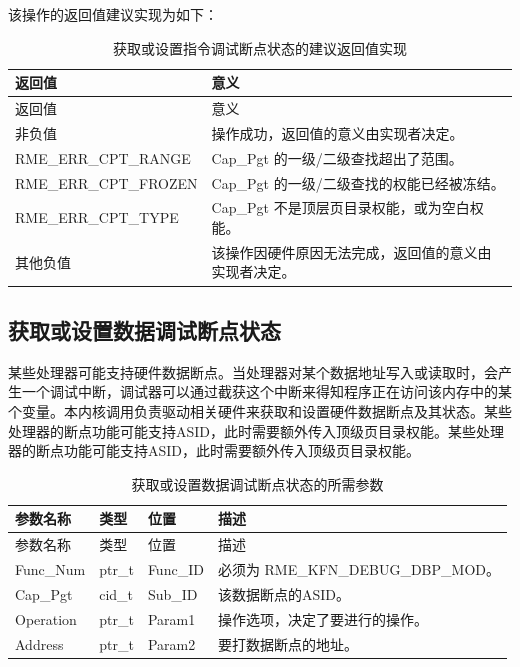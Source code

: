 该操作的返回值建议实现为如下：

\begin{xltabular}{\textwidth}{@{}>{\hsize\raggedright\arraybackslash}X>{\hsize\raggedright\arraybackslash}X@{}}
\caption{获取或设置指令调试断点状态的建议返回值实现}\label{tab:8-120-get-or-set-instruction-breakpoint-state-suggested-return-values}\\
\toprule
返回值 & 意义\tabularnewline
\endfirsthead
\toprule
返回值 & 意义\tabularnewline
\midrule
\endhead
\bottomrule
\endlastfoot
    非负值 & 操作成功，返回值的意义由实现者决定。\tabularnewline
    RME\_ERR\_CPT\_RANGE & Cap\_Pgt 的一级/二级查找超出了范围。\tabularnewline
    RME\_ERR\_CPT\_FROZEN & Cap\_Pgt 的一级/二级查找的权能已经被冻结。\tabularnewline
    RME\_ERR\_CPT\_TYPE & Cap\_Pgt 不是顶层页目录权能，或为空白权能。\tabularnewline
    其他负值 & 该操作因硬件原因无法完成，返回值的意义由实现者决定。\tabularnewline
\end{xltabular}

\subsection{获取或设置数据调试断点状态}\label{subsec:8-get-or-set-data-breakpoint-state}

某些处理器可能支持硬件数据断点。当处理器对某个数据地址写入或读取时，会产生一个调试中断，调试器可以通过截获这个中断来得知程序正在访问该内存中的某个变量。本内核调用负责驱动相关硬件来获取和设置硬件数据断点及其状态。某些处理器的断点功能可能支持ASID，此时需要额外传入顶级页目录权能。某些处理器的断点功能可能支持ASID，此时需要额外传入顶级页目录权能。

\begin{xltabular}{\textwidth}{@{}>{\hsize\raggedright\arraybackslash}X>{\hsize\raggedright\arraybackslash}X>{\hsize\raggedright\arraybackslash}X>{\hsize\raggedright\arraybackslash}X@{}}
\caption{获取或设置数据调试断点状态的所需参数}\label{tab:8-121-get-or-set-data-breakpoint-state-parameters}\\
\toprule
参数名称 & 类型 & 位置 & 描述\tabularnewline
\endfirsthead
\toprule
参数名称 & 类型 & 位置 & 描述\tabularnewline
\midrule
\endhead
\bottomrule
\endlastfoot
Func\_Num & ptr\_t & Func\_ID & 必须为 RME\_KFN\_DEBUG\_DBP\_MOD。\tabularnewline
Cap\_Pgt & cid\_t & Sub\_ID & 该数据断点的ASID。\tabularnewline
Operation & ptr\_t & Param1 &
操作选项，决定了要进行的操作。\tabularnewline
Address & ptr\_t & Param2 & 要打数据断点的地址。\tabularnewline
\end{xltabular}

